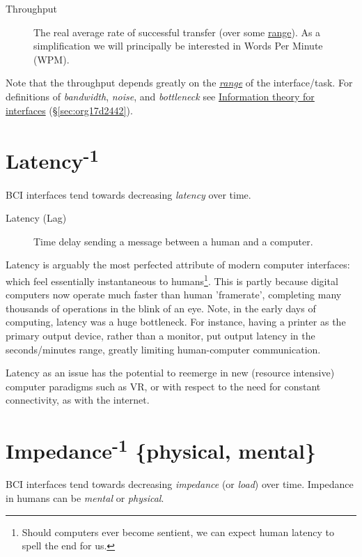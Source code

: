 \documentclass[logo,bsc,singlespacing,parskip]{infthesis}
\begin{document}
\begin{mdframed}
\begin{description}
\item[{Throughput\label{throughput}}] The real average rate of successful transfer (over some  \hyperref[range]{range}). As a simplification we will principally be interested in Words Per Minute (WPM).
\end{description}
\end{mdframed}

Note that the throughput depends greatly on the \emph{\hyperref[range]{range}} of the interface/task.
For definitions of \emph{bandwidth}, \emph{noise}, and \emph{bottleneck} see \hyperref[sec:org17d2442]{Information theory for interfaces} (\S \ref{sec:org17d2442}).

\section{Latency\textsuperscript{-1}}
\label{sec:org9503c40}
BCI interfaces tend towards decreasing \emph{latency} over time.

\begin{mdframed}
\begin{description}
\item[{Latency\label{latency} (Lag)}] Time delay sending a message between a human and a computer.
\end{description}
\end{mdframed}

Latency is arguably the most perfected attribute of modern computer interfaces: which feel essentially instantaneous to humans\footnote{Should computers ever become sentient, we can expect human latency to spell the end for us.}.
This is partly because digital computers now operate much faster than human 'framerate', completing many thousands of operations in the blink of an eye.
Note, in the early days of computing, latency was a huge bottleneck.
For instance, having a printer as the primary output device, rather than a monitor, put output latency in the seconds/minutes range, greatly limiting human-computer communication.

Latency as an issue has the potential to reemerge in new (resource intensive) computer paradigms such as VR, or with respect to the need for constant connectivity, as with the internet.

\section{Impedance\textsuperscript{-1} \{physical, mental\}}
\label{sec:org700fae4}
BCI interfaces tend towards decreasing \emph{impedance} (or \emph{load}) over time.
Impedance in humans can be \emph{mental} or \emph{physical}.
\end{document}
